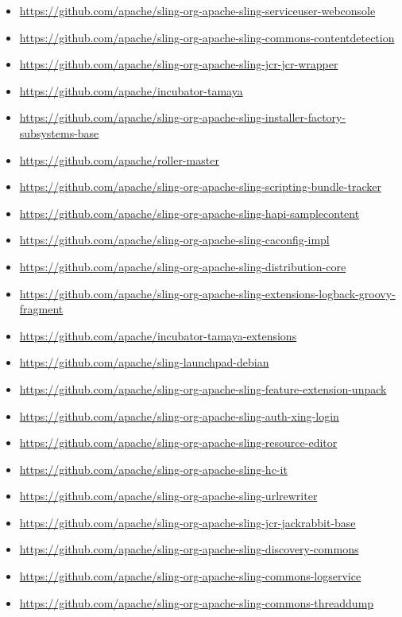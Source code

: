 \documentclass[sigconf]{acmart}
\begin{document}
\begin{itemize}
  \item \url{https://github.com/apache/sling-org-apache-sling-serviceuser-webconsole}
  \item \url{https://github.com/apache/sling-org-apache-sling-commons-contentdetection}
  \item \url{https://github.com/apache/sling-org-apache-sling-jcr-jcr-wrapper}
  \item \url{https://github.com/apache/incubator-tamaya}
  \item \url{https://github.com/apache/sling-org-apache-sling-installer-factory-subsystems-base}
  \item \url{https://github.com/apache/roller-master}
  \item \url{https://github.com/apache/sling-org-apache-sling-scripting-bundle-tracker}
  \item \url{https://github.com/apache/sling-org-apache-sling-hapi-samplecontent}
  \item \url{https://github.com/apache/sling-org-apache-sling-caconfig-impl}
  \item \url{https://github.com/apache/sling-org-apache-sling-distribution-core}
  \item \url{https://github.com/apache/sling-org-apache-sling-extensions-logback-groovy-fragment}
  \item \url{https://github.com/apache/incubator-tamaya-extensions}
  \item \url{https://github.com/apache/sling-launchpad-debian}
  \item \url{https://github.com/apache/sling-org-apache-sling-feature-extension-unpack}
  \item \url{https://github.com/apache/sling-org-apache-sling-auth-xing-login}
  \item \url{https://github.com/apache/sling-org-apache-sling-resource-editor}
  \item \url{https://github.com/apache/sling-org-apache-sling-hc-it}
  \item \url{https://github.com/apache/sling-org-apache-sling-urlrewriter}
  \item \url{https://github.com/apache/sling-org-apache-sling-jcr-jackrabbit-base}
  \item \url{https://github.com/apache/sling-org-apache-sling-discovery-commons}
  \item \url{https://github.com/apache/sling-org-apache-sling-commons-logservice}
  \item \url{https://github.com/apache/sling-org-apache-sling-commons-threaddump}

\end{itemize}
\end{document}

